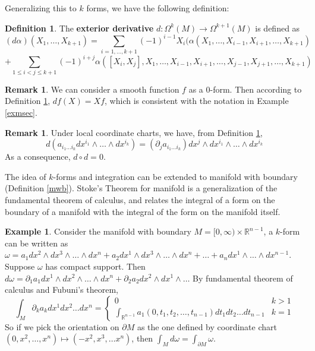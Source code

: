 \documentclass{article}
\theoremstyle{definition}
\newtheorem{dfn}[thm]{Definition}
\newtheorem{rmk}[thm]{Remark}
\newtheorem{exm}[thm]{Example}
\begin{document}
Generalizing this to $k$ forms, we have the following definition:

\begin{dfn}\label{dfnext}
    The {\bf exterior derivative} $d: \Omega^k(M)\rightarrow \Omega^{k+1}(M)$ is defined as
    \[(d\alpha)(X_1, \dots, X_{k+1})=\sum_{i=1, \dots, k+1}(-1)^{i-1}X_i(\alpha(X_1, \dots, X_{i-1}, X_{i+1},\dots, X_{k+1})\]
    \[+\sum_{1\leq i<j\leq k+1}(-1)^{i+j}\alpha([X_i, X_j], X_1, \dots, X_{i-1}, X_{i+1}, \dots, X_{j-1}, X_{j+1},\dots, X_{k+1})\]
\end{dfn}

\begin{rmk}
    We can consider a smooth function $f$ as a 0-form. Then according to Definition \ref{dfnext}, $df(X)=Xf$, which is consistent with the notation in Example \ref{exmsec}.
\end{rmk}

\begin{rmk}\label{ddexp}
    Under local coordinate charts, we have, from Definition \ref{dfnext},
    \[d(a_{i_1\dots i_k}dx^{i_1}\wedge \dots \wedge dx^{i_k})=(\partial_j a_{i_1\dots i_k}) dx^j\wedge dx^{i_1}\wedge \dots \wedge dx^{i_k}\]
    As a consequence, $d\circ d=0$.
\end{rmk}

The idea of $k$-forms and integration can be extended to manifold with boundary (Definition \ref{mwb}). Stoke's Theorem for manifold is a generalization of the fundamental theorem of calculus, and relates the integral of a form on the boundary of a manifold with the integral of the form on the manifold itself. 

\begin{exm}\label{stoexm}
    Consider the manifold with boundary $M=[0, \infty)\times\mathbb{R}^{n-1}$, a $k$-form can be written as $\omega=a_1dx^2\wedge dx^3\wedge\dots \wedge dx^n+a_2dx^1\wedge dx^3\wedge\dots\wedge dx^n+\dots+a_ndx^1\wedge \dots \wedge dx^{n-1}$. Suppose $\omega$ has compact support. Then $d\omega={\partial_1a_1}dx^1\wedge dx^2\wedge\dots\wedge dx^n+{\partial_2a_2}dx^2\wedge dx^1\wedge\dots$
    By fundamental theorem of calculus and Fubuni's theorem, \[\int_M {\partial_ka_k}dx^1dx^2\dots dx^n=\begin{cases} 0 & k>1\\ \int_{\mathbb{R}^{n-1}}a_1(0, t_1, t_2,\dots, t_{n-1})dt_1dt_2\dots dt_{n-1} & k=1\end{cases}\]
    So if we pick the orientation on $\partial M$ as the one defined by coordinate chart $(0, x^2,\dots, x^n)\mapsto (-x^2, x^3, \dots x^n)$, then $\int_M d\omega=\int_{\partial M}\omega$.
\end{exm}
\end{document}
